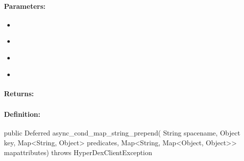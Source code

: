 \paragraph{Parameters:}
\begin{itemize}[noitemsep]
\item {}\\

\item {}\\

\item {}\\

\item {}\\

\end{itemize}

\paragraph{Returns:}


\pagebreak
\subsubsection{}
\label{api:java:async_cond_map_string_prepend}


\paragraph{Definition:}
\begin{javacode}
public Deferred async_cond_map_string_prepend(
        String spacename,
        Object key,
        Map<String, Object> predicates,
        Map<String, Map<Object, Object>> mapattributes) throws HyperDexClientException
\end{javacode}

